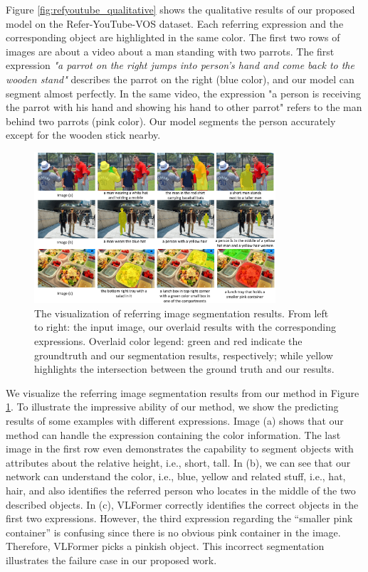 Figure \ref{fig:refyoutube_qualitative} shows the qualitative results of our proposed model on the Refer-YouTube-VOS dataset. Each referring expression and the corresponding object are highlighted in the same color. The first two rows of images are about a video about a man standing with two parrots. The first expression \textit{"a parrot on the right jumps into person's hand and come back to the wooden stand"} describes the parrot on the right (blue color), and our model can segment almost perfectly. In the same video, the expression "a person is receiving the parrot with his hand and showing his hand to other parrot" refers to the man behind two parrots (pink color). Our model segments the person accurately except for the wooden stick nearby. 



\begin{figure}[t]
    \centering
    \includegraphics[width=0.8\textwidth]{content/resources/images/referring_segmentation/Visualization_New.pdf}
    \caption{The visualization of referring image segmentation results. From left to right: the input image, our overlaid results with the corresponding expressions. Overlaid color legend: green and red indicate the groundtruth and our segmentation results, respectively; while yellow highlights the intersection between the ground truth and our results.  }
    \label{fig:visualization}
\end{figure}

We visualize the referring image segmentation results from our method in Figure \ref{fig:visualization}. To illustrate the impressive ability of our method, we show the predicting results of some examples with different expressions. Image (a) shows that our method can handle the expression containing the color information. The last image in the first row even demonstrates the capability to segment objects with attributes about the relative height, i.e., short, tall. In (b), we can see that our network can understand the color, i.e., blue, yellow and related stuff, i.e., hat, hair, and also identifies the referred person who locates in the middle of the two described objects. In (c), VLFormer correctly identifies the correct objects in the first two expressions. However, the third expression regarding the ``smaller pink container'' is confusing since there is no obvious pink container in the image. Therefore, VLFormer picks a pinkish object. This incorrect segmentation illustrates the failure case in our proposed work.


